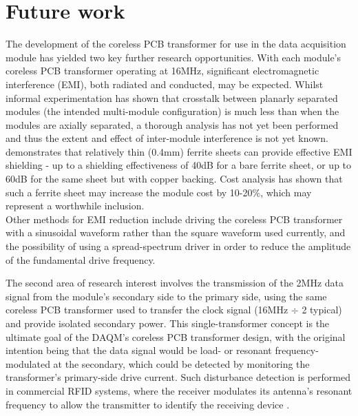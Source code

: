 \documentclass[conference]{IEEEtran}
\begin{document}
\section{Future work}
The development of the coreless PCB transformer for use in the data acquisition module has yielded two key further research opportunities.  
With each module's coreless PCB transformer operating at 16MHz, significant electromagnetic interference (EMI), both radiated and conducted, may be expected.  Whilst informal experimentation has shown that crosstalk between planarly separated modules (the intended multi-module configuration) is much less than when the modules are axially separated, a thorough analysis has not yet been performed and thus the extent and effect of inter-module interference is not yet known.  \cite{EMIShield} demonstrates that relatively thin (0.4mm) ferrite sheets can provide effective EMI shielding - up to a shielding effectiveness of 40dB for a bare ferrite sheet, or up to 60dB for the same sheet but with copper backing.  Cost analysis has shown that such a ferrite sheet may increase the module cost by 10-20\%, which may represent a worthwhile inclusion.  \\
Other methods for EMI reduction include driving the coreless PCB transformer with a sinusoidal waveform rather than the square waveform used currently, and the possibility of using a spread-spectrum driver in order to reduce the amplitude of the fundamental drive frequency.

The second area of research interest involves the transmission of the 2MHz data signal from the module's secondary side to the primary side, using the same coreless PCB transformer used to transfer the clock signal (16MHz $ \div $ 2 typical) and provide isolated secondary power.  This single-transformer concept is the ultimate goal of the DAQM's coreless PCB transformer design, with the original intention being that the data signal would be load- or resonant frequency-modulated at the secondary, which could be detected by monitoring the transformer's primary-side drive current.  Such disturbance detection is performed in commercial RFID systems, where the receiver modulates its antenna's resonant frequency to allow the transmitter to identify the receiving device \cite{RFID}.  
\end{document}
